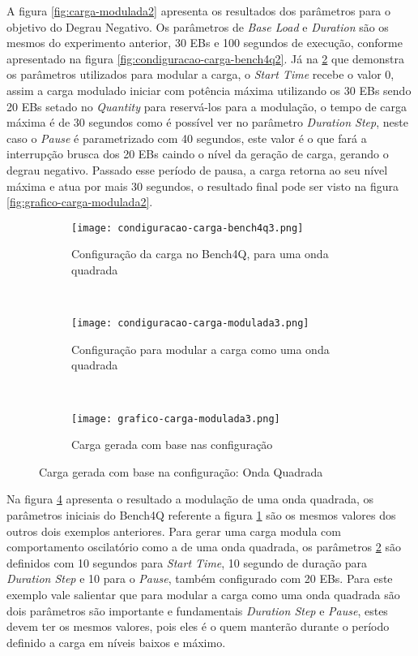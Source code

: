 A figura \ref{fig:carga-modulada2} apresenta os resultados dos parâmetros para o objetivo do Degrau Negativo. Os parâmetros de \textit{Base Load} e \textit{Duration} são os mesmos do experimento anterior, 30 EBs e 100 segundos de execução, conforme apresentado na figura \ref{fig:condiguracao-carga-bench4q2}. Já na \ref{fig:condiguracao-carga-modulada3} que demonstra os parâmetros utilizados para modular a carga, o \textit{Start Time} recebe o valor 0, assim a carga modulado iniciar com potência máxima utilizando os 30 EBs sendo 20 EBs setado no \textit{Quantity} para reservá-los para a modulação, o tempo de carga máxima é de 30 segundos como é possível ver no parâmetro \textit{Duration Step}, neste caso o \textit{Pause} é parametrizado com 40 segundos, este valor é o que fará a interrupção brusca dos 20 EBs caindo o nível da geração de carga, gerando o degrau negativo. Passado esse período de pausa, a carga retorna ao seu nível máxima e atua por mais 30 segundos, o resultado final pode ser visto na figura \ref{fig:grafico-carga-modulada2}. 

\begin{figure}[!htb]
	\begin{subfigure}{\linewidth}
		\centering
		\texttt{[image: condiguracao-carga-bench4q3.png]}
		\caption{Configuração da carga no Bench4Q, para uma onda quadrada}
		\label{fig:condiguracao-carga-bench4q3}
	\end{subfigure}\\
	\begin{subfigure}{\linewidth}
		\centering
		\texttt{[image: condiguracao-carga-modulada3.png]}
		\caption{Configuração para modular a carga como uma onda quadrada}
		\label{fig:condiguracao-carga-modulada3}
	\end{subfigure}\\[1ex]
	\begin{subfigure}{\linewidth}
		\centering
		\texttt{[image: grafico-carga-modulada3.png]}
		\caption{Carga gerada com base nas configuração}
		\label{fig:grafico-carga-modulada3}
	\end{subfigure}
	\caption{Carga gerada com base na configuração: Onda Quadrada}
	\label{fig:carga-modulada3}
	\fautor
\end{figure}

Na figura \ref{fig:carga-modulada3} apresenta o resultado a modulação de uma onda quadrada, os parâmetros iniciais do Bench4Q referente a figura \ref{fig:condiguracao-carga-bench4q3} são os mesmos valores dos outros dois exemplos anteriores. Para gerar uma carga modula com comportamento oscilatório como a de uma onda quadrada, os parâmetros \ref{fig:condiguracao-carga-modulada3} são definidos com 10 segundos para \textit{Start Time}, 10 segundo de duração para \textit{Duration Step} e 10 para o \textit{Pause}, também configurado com 20 EBs. Para este exemplo vale salientar que para modular a carga como uma onda quadrada são dois parâmetros são importante e fundamentais \textit{Duration Step} e \textit{Pause}, estes devem ter os mesmos valores, pois eles é o quem manterão durante o período definido a carga em níveis baixos e máximo. 

